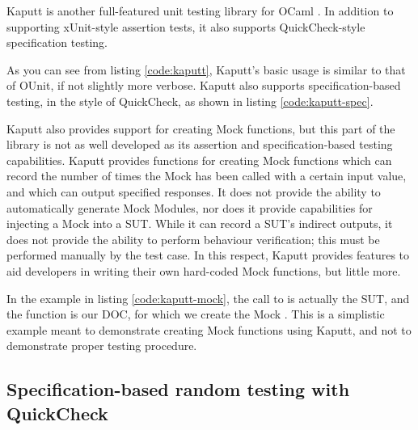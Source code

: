 Kaputt is another full-featured unit testing library for OCaml
\cite{www:kaputt}. In addition to supporting xUnit-style assertion
tests, it also supports QuickCheck-style specification testing.




As you can see from listing \ref{code:kaputt}, Kaputt's basic usage is
similar to that of OUnit, if not slightly more verbose. Kaputt also
supports specification-based testing, in the style of QuickCheck, as
shown in listing \ref{code:kaputt-spec}.



Kaputt also provides support for creating Mock functions, but this
part of the library is not as well developed as its assertion and
specification-based testing capabilities. Kaputt provides functions
for creating Mock functions which can record the number of times the
Mock has been called with a certain input value, and which can output
specified responses. It does not provide the ability to automatically
generate Mock Modules, nor does it provide capabilities for injecting
a Mock into a SUT. While it can record a SUT's indirect outputs, it
does not provide the ability to perform behaviour verification; this
must be performed manually by the test case. In this respect, Kaputt
provides features to aid developers in writing their own hard-coded
Mock functions, but little more.




In the example in listing \ref{code:kaputt-mock}, the call to
 is actually the SUT, and the function  is
our DOC, for which we create the Mock . This is a simplistic
example meant to demonstrate creating Mock functions using Kaputt, and
not to demonstrate proper testing procedure.

\subsection{Specification-based random testing with QuickCheck}

